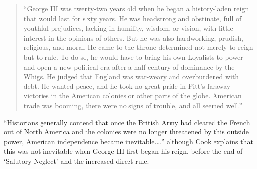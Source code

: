 \begin{quote}
``George III was twenty-two years old when he began a history-laden reign that
would last for sixty years. He was headstrong and obstinate, full of youthful
prejudices, lacking in humility, wisdom, or vision, with little interest in the
opinions of others. But he was also hardworking, prudish, religious, and moral.
He came to the throne determined not merely to reign but to rule. To do so, he
would have to bring his own Loyalists to power and open a new political era
after a half century of dominance by the Whigs. He judged that England was
war-weary and overburdened with debt. He wanted peace, and he took no great
pride in Pitt's faraway victories in the American colonies or other parts of the
globe. American trade was booming, there were no signs of trouble, and all
seemed well.'' \cite[p. 5]{cook_long_1995}
\end{quote}

%
%
%



``Historians generally contend that once the British Army had cleared the French
out of North America and the colonies were no longer threatened by this outside
power, American independence became inevitable.\ldots'' although Cook explains
that this was not inevitable when George III first began his reign, before the
end of `Salutory Neglect' and the increased direct rule.\cite[p. 5]{cook_long_1995} 

%

